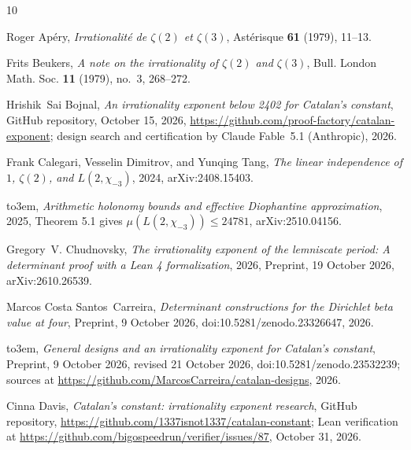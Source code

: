 \documentclass[11pt]{amsart}
\theoremstyle{definition}
\theoremstyle{remark}
\numberwithin{equation}{section}
\begin{document}
\providecommand{\bysame}{\leavevmode\hbox to3em{\hrulefill}\thinspace}
\providecommand{\MR}{\relax\ifhmode\unskip\space\fi MR }
\providecommand{\MRhref}[2]{%
  \href{http://www.ams.org/mathscinet-getitem?mr=#1}{#2}
}
\providecommand{\href}[2]{#2}
\begin{thebibliography}{10}

Roger Ap\'ery, \emph{Irrationalit\'e de {$\zeta(2)$} et {$\zeta(3)$}},
  Ast\'erisque \textbf{61} (1979), 11--13.

Frits Beukers, \emph{A note on the irrationality of {$\zeta(2)$} and
  {$\zeta(3)$}}, Bull. London Math. Soc. \textbf{11} (1979), no.~3, 268--272.

Hrishik~Sai Bojnal, \emph{An irrationality exponent below 2402 for {C}atalan's
  constant}, GitHub repository, October 15, 2026,
  \url{https://github.com/proof-factory/catalan-exponent}; design search and
  certification by Claude Fable~5.1 (Anthropic), 2026.

Frank Calegari, Vesselin Dimitrov, and Yunqing Tang, \emph{The linear
  independence of {$1$}, {$\zeta(2)$}, and {$L(2,\chi_{-3})$}}, 2024,
  \href{https://arxiv.org/abs/2408.15403}{arXiv:2408.15403}.

\bysame, \emph{Arithmetic holonomy bounds and effective {D}iophantine
  approximation}, 2025, Theorem 5.1 gives $\mu(L(2,\chi_{-3}))\le 24781$,
  \href{https://arxiv.org/abs/2510.04156}{arXiv:2510.04156}.

Gregory~V. Chudnovsky, \emph{The irrationality exponent of the lemniscate
  period: {A} determinant proof with a {L}ean 4 formalization}, 2026, Preprint,
  19 October 2026, \href{https://arxiv.org/abs/2610.26539}{arXiv:2610.26539}.

Marcos Costa Santos~Carreira, \emph{Determinant constructions for the
  {D}irichlet beta value at four}, Preprint, 9 October 2026,
  \href{https://doi.org/10.5281/zenodo.23326647}{doi:10.5281/zenodo.23326647},
  2026.

\bysame, \emph{General designs and an irrationality exponent for {C}atalan's
  constant}, Preprint, 9 October 2026, revised 21 October 2026,
  \href{https://doi.org/10.5281/zenodo.23532239}{doi:10.5281/zenodo.23532239};
  sources at \url{https://github.com/MarcosCarreira/catalan-designs}, 2026.

Cinna Davis, \emph{Catalan's constant: irrationality exponent research}, GitHub
  repository, \url{https://github.com/1337isnot1337/catalan-constant}; Lean
  verification at \url{https://github.com/bigospeedrun/verifier/issues/87},
  October 31, 2026.


\end{thebibliography}
\end{document}
